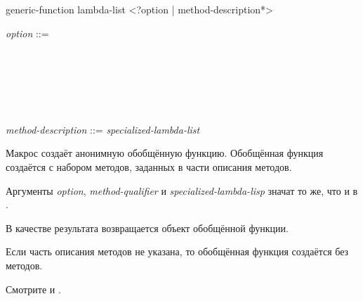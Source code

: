 \begin{defmac}
generic-function lambda-list <?option | {method-description}*>

\begin{tabbing}
\emph{option} ::=  \\
~~~ \Mor~ \\
~~~ \Mor~ \\
~~~ \Mor~ \\
~~~ \Mor~ \\
~~~ \Mor~ \\\\
 \emph{method-description} ::=    \emph{specialized-lambda-list} 
\cd{)}
\end{tabbing}
Макрос  создаёт анонимную обобщённую функцию. Обобщённая
функция создаётся с набором методов, заданных в части описания методов.

Аргументы \emph{option}, \emph{method-qualifier} и
\emph{specialized-lambda-lisp} значат то же, что и в .

В качестве результата возвращается объект обобщённой функции.

Если часть описания методов не указана, то обобщённая функция создаётся без
методов.

Смотрите  и .
\end{defmac}


